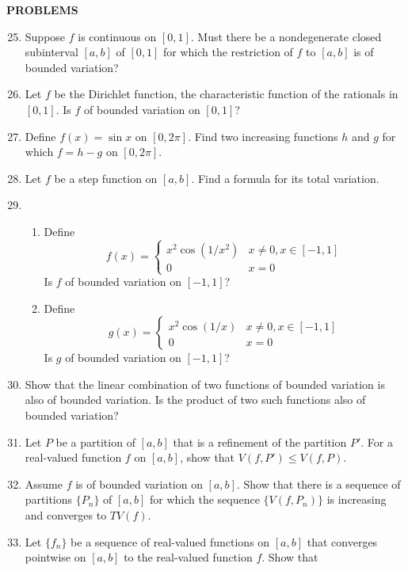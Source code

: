 \begin{center}
	\textbf{PROBLEMS}
\end{center}
\begin{enumerate}
	\setcounter{enumi}{24}
    \item Suppose $f$ is continuous on $[0,1]$. Must there be a nondegenerate closed subinterval $[a,b]$ of $[0,1]$ for which the restriction of $f$ to $[a,b]$ is of bounded variation?
    \item Let $f$ be the Dirichlet function, the characteristic function of the rationals in $[0,1]$. Is $f$ of bounded variation on $[0,1]$?
    \item Define $f(x)=\sin x$ on $[0,2\pi]$. Find two increasing functions $h$ and $g$ for which $f=h-g$ on $[0,2\pi]$.
    \item Let $f$ be a step function on $[a,b]$. Find a formula for its total variation.
    \item
    \begin{enumerate}[label=(\roman*),align=left]
        \item Define
        \[
            f(x)=
            \begin{cases}
                x^2\cos(1/x^2)&x\neq0,x\in[-1,1]\\
                0&x=0
            \end{cases}  
        \]
        Is $f$ of bounded variation on $[-1,1]$?
        \item Define
        \[
            g(x)=
            \begin{cases}
                x^2\cos(1/x)&x\neq0,x\in[-1,1]\\
                0&x=0
            \end{cases}  
        \]
        Is $g$ of bounded variation on $[-1,1]$?
    \end{enumerate}
    \item Show that the linear combination of two functions of bounded variation is also of bounded variation.
    Is the product of two such functions also of bounded variation?
    \item Let $P$ be a partition of $[a,b]$ that is a refinement of the partition $P'$. For a real-valued function $f$ on $[a,b]$, show that $V(f,P')\le V(f,P)$.
    \item Assume $f$ is of bounded variation on $[a,b]$. Show that there is a sequence of partitions $\{P_n\}$ of $[a,b]$ for which the sequence $\{V(f,P_n)\}$ is increasing and converges to $TV(f)$.
    \item Let $\{f_n\}$ be a sequence of real-valued functions on $[a,b]$ that converges pointwise on $[a,b]$ to the real-valued function $f$. Show that 

\end{enumerate}

